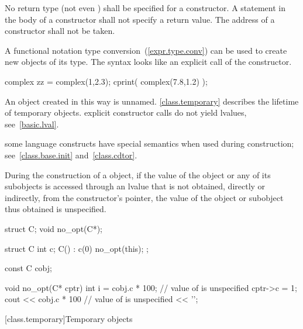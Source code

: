 \pnum
{}%
%
No return type (not even
)
shall be specified for a constructor.
A
statement in the body of a constructor shall not specify a return value.
%
The address of a constructor shall not be taken.

\pnum
{}%
%
A functional notation type conversion~(\ref{expr.type.conv}) can be used
to create new objects of its type.
\enternote
The syntax looks like an explicit call of the constructor.
\exitnote
\enterexample
{}%

\begin{codeblock}
complex zz = complex(1,2.3);
cprint( complex(7.8,1.2) );
\end{codeblock}
\exitexampleb
An object created in this way is unnamed.
\enternote
\ref{class.temporary} describes the lifetime of temporary objects.
\exitnote
\enternote
explicit constructor calls do not yield lvalues, see~\ref{basic.lval}.
\exitnote

\pnum
\enternote
{}%
some language constructs have special semantics when used during construction;
see~\ref{class.base.init} and~\ref{class.cdtor}.
\exitnote

\pnum
During the construction of a
object, if the value of the object or any of its subobjects is
accessed through an lvalue that is not obtained, directly or indirectly, from
the constructor's
pointer, the value of the object or subobject thus obtained is unspecified.
\enterexample

\begin{codeblock}
struct C;
void no_opt(C*);

struct C {
	int c;
	C() : c(0) { no_opt(this); }
};

const C cobj;

void no_opt(C* cptr) {
	int i = cobj.c * 100;   // value of  is unspecified
	cptr->c = 1;
	cout << cobj.c * 100    // value of  is unspecified
	     << '\n';
}
\end{codeblock}
\exitexampleb

[class.temporary]{Temporary objects}

